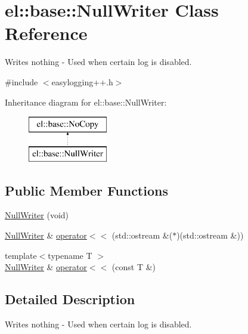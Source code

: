 \hypertarget{classel_1_1base_1_1_null_writer}{}\section{el\+:\+:base\+:\+:Null\+Writer Class Reference}
\label{classel_1_1base_1_1_null_writer}


Writes nothing -\/ Used when certain log is disabled.  




{\ttfamily \#include $<$easylogging++.\+h$>$}

Inheritance diagram for el\+:\+:base\+:\+:Null\+Writer\+:\begin{figure}[H]
\begin{center}
\leavevmode
\includegraphics[height=2.000000cm]{classel_1_1base_1_1_null_writer}
\end{center}
\end{figure}
\subsection*{Public Member Functions}
\begin{DoxyCompactItemize}
\item 
\hyperlink{classel_1_1base_1_1_null_writer_a936572812bfcd5a34ed928f11cac9e22}{Null\+Writer} (void)
\item 
\hyperlink{classel_1_1base_1_1_null_writer}{Null\+Writer} \& \hyperlink{classel_1_1base_1_1_null_writer_a39cb7d47986d70c2b4e9d78d1482da7d}{operator$<$$<$} (std\+::ostream \&($\ast$)(std\+::ostream \&))
\item 
{\footnotesize template$<$typename T $>$ }\\\hyperlink{classel_1_1base_1_1_null_writer}{Null\+Writer} \& \hyperlink{classel_1_1base_1_1_null_writer_a57cb0f5d93ebac076b8ef94d6eff65a2}{operator$<$$<$} (const T \&)
\end{DoxyCompactItemize}


\subsection{Detailed Description}
Writes nothing -\/ Used when certain log is disabled. 


